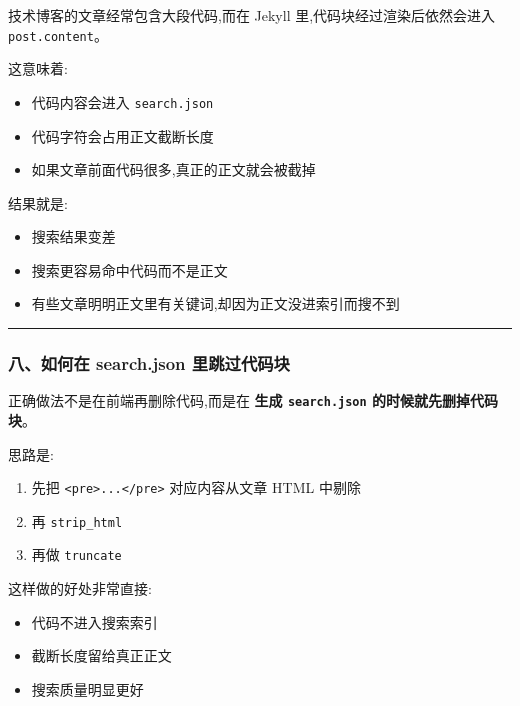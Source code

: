 \documentclass[lang=cn,scheme=chinese,color=blue,device=normal,toc=onecol,math=cm]{elegantbook}
\begin{document}
技术博客的文章经常包含大段代码,而在 Jekyll 里,代码块经过渲染后依然会进入 \texttt{post.content}。\par


这意味着:\par


\begin{itemize}
\item 代码内容会进入 \texttt{search.json}
\item 代码字符会占用正文截断长度
\item 如果文章前面代码很多,真正的正文就会被截掉
\end{itemize}


结果就是:\par


\begin{itemize}
\item 搜索结果变差
\item 搜索更容易命中代码而不是正文
\item 有些文章明明正文里有关键词,却因为正文没进索引而搜不到
\end{itemize}


\medskip\hrule\medskip


\subsubsection{八、如何在 search.json 里跳过代码块}


正确做法不是在前端再删除代码,而是在 \textbf{生成 \texttt{search.json} 的时候就先删掉代码块}。\par


思路是:\par


\begin{enumerate}
\item 先把 \texttt{<pre>...</\allowbreak{}pre>} 对应内容从文章 HTML 中剔除
\item 再 \texttt{strip\_\allowbreak{}html}
\item 再做 \texttt{truncate}
\end{enumerate}


这样做的好处非常直接:\par


\begin{itemize}
\item 代码不进入搜索索引
\item 截断长度留给真正正文
\item 搜索质量明显更好
\end{itemize}
\end{document}
